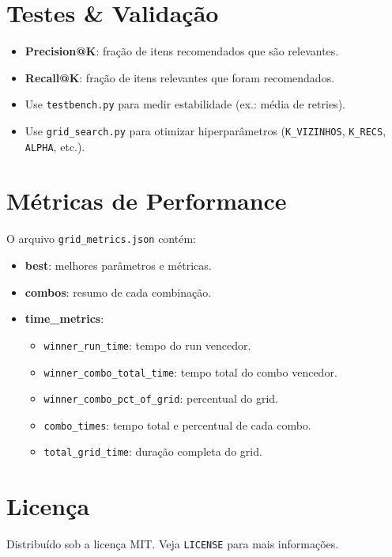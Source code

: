 \documentclass[a4paper,12pt]{article}
\begin{document}
\section*{Testes \& Validação}
\begin{itemize}
  \item \textbf{Precision@K}: fração de itens recomendados que são relevantes.
  \item \textbf{Recall@K}: fração de itens relevantes que foram recomendados.
  \item Use \texttt{testbench.py} para medir estabilidade (ex.: média de retries).
  \item Use \texttt{grid\_search.py} para otimizar hiperparâmetros (\texttt{K\_VIZINHOS}, \texttt{K\_RECS}, \texttt{ALPHA}, etc.).
\end{itemize}

\section*{Métricas de Performance}
O arquivo \texttt{grid\_metrics.json} contém:
\begin{itemize}
  \item \textbf{best}: melhores parâmetros e métricas.
  \item \textbf{combos}: resumo de cada combinação.
  \item \textbf{time\_metrics}: 
    \begin{itemize}
      \item \texttt{winner\_run\_time}: tempo do run vencedor.
      \item \texttt{winner\_combo\_total\_time}: tempo total do combo vencedor.
      \item \texttt{winner\_combo\_pct\_of\_grid}: percentual do grid.
      \item \texttt{combo\_times}: tempo total e percentual de cada combo.
      \item \texttt{total\_grid\_time}: duração completa do grid.
    \end{itemize}
\end{itemize}

\section*{Licença}
Distribuído sob a licença MIT. Veja \texttt{LICENSE} para mais informações.
\end{document}

